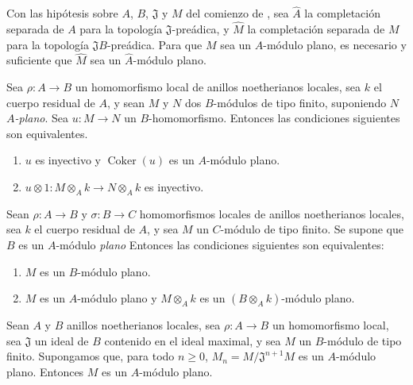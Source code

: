 \begin{env}[10.2.3]
\label{0.10.2.3}
\label{0.10.2.3-fr}
Con las hipótesis sobre $A$, $B$, $\mathfrak{J}$ y $M$ del comienzo de , sea $\widehat A$ la completación separada de $A$ para la topología $\mathfrak{J}$-preádica, y $\widehat M$ la completación separada de $M$ para la topología $\mathfrak{J}B$-preádica.
Para que $M$ sea un $A$-módulo plano, es necesario y suficiente que $\widehat M$ sea un $\widehat A$-módulo plano.
\end{env}

\begin{env}[10.2.4]
\label{0.10.2.4}
\label{0.10.2.4-fr}
Sea $\rho:A\to B$ un homomorfismo local de anillos noetherianos locales, sea $k$ el cuerpo residual de $A$, y sean $M$ y $N$ dos $B$-módulos de tipo finito, suponiendo $N$ \emph{$A$-plano}.
Sea $u:M\to N$ un $B$-homomorfismo.
Entonces las condiciones siguientes son equivalentes.
\begin{enumerate}
  \item[(a)] $u$ es inyectivo y $\operatorname{Coker}(u)$ es un $A$-módulo plano.
  \item[(b)] $u\otimes1:M\otimes_A k\to N\otimes_A k$ es inyectivo.
\end{enumerate}
\end{env}

\begin{env}[10.2.5]
\label{0.10.2.5}
\label{0.10.2.5-fr}
Sean $\rho:A\to B$ y $\sigma:B\to C$ homomorfismos locales de anillos noetherianos locales, sea $k$ el cuerpo residual de $A$, y sea $M$ un $C$-módulo de tipo finito.
Se supone que $B$ es un $A$-módulo \emph{plano} Entonces las condiciones
siguientes son equivalentes:
\begin{enumerate}
  \item[$a)$] $M$ es un $B$-módulo plano.
  \item[$b)$] $M$ es un $A$-módulo plano y $M\otimes_A k$ es un $(B\otimes_A k)$-módulo plano.
\end{enumerate}
\end{env}

\begin{proposition}[10.2.6]
\label{0.10.2.6}
\label{0.10.2.6-fr}
Sean $A$ y $B$ anillos noetherianos locales, sea $\rho:A\to B$ un homomorfismo local, sea $\mathfrak{J}$ un ideal de $B$ contenido en el ideal maximal, y sea $M$ un $B$-módulo de tipo finito.
Supongamos que, para todo $n\geq0$, $M_n=M/\mathfrak{J}^{n+1}M$ es un $A$-módulo plano.
Entonces $M$ es un $A$-módulo plano.
\end{proposition}


